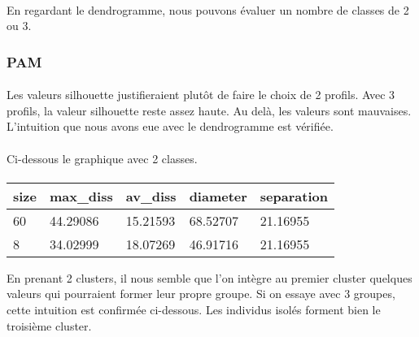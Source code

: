 \documentclass[11pt]{article}
\begin{document}
    
\paragraph{}En regardant le dendrogramme, nous pouvons évaluer un nombre de classes
de 2 ou 3.

    \subsubsection{PAM}\label{pam}



    \begin{center}
    \end{center}
    
    
\paragraph{}
Les valeurs silhouette justifieraient plutôt de faire le choix de 2
profils. Avec 3 profils, la valeur silhouette reste assez haute. Au
delà, les valeurs sont mauvaises. L'intuition que nous avons eue avec le
dendrogramme est vérifiée.
\paragraph{}
    Ci-dessous le graphique avec 2 classes.
\paragraph{}


    \begin{tabular}{lllll}
 size & max\_diss & av\_diss & diameter & separation\\
\hline
	 60       & 44.29086 & 15.21593 & 68.52707 & 21.16955\\
	  8       & 34.02999 & 18.07269 & 46.91716 & 21.16955\\
\end{tabular}


    
    \begin{center}
    \end{center}
    
    
    En prenant 2 clusters, il nous semble que l'on intègre au premier
cluster quelques valeurs qui pourraient former leur propre groupe. Si on
essaye avec 3 groupes, cette intuition est confirmée ci-dessous. Les
individus isolés forment bien le troisième cluster.
\end{document}
